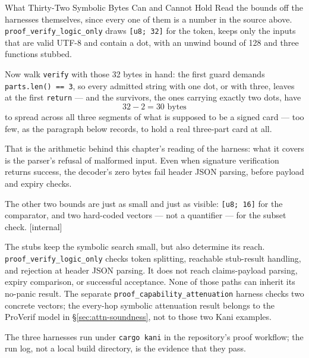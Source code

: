 \documentclass[11pt,a4paper]{article}
\theoremstyle{definition}
\begin{document}
\begin{pdexample}{What Thirty-Two Symbolic Bytes Can and Cannot Hold}
\setlength{\parskip}{4pt plus 1pt}
Read the bounds off the harnesses themselves, since every one of them is a
number in the source above. \texttt{proof\_verify\_logic\_only} draws
\texttt{[u8;\,32]} for the token, keeps only the inputs that are valid UTF-8
and contain a dot, with an unwind bound of 128 and three functions stubbed.

Now walk \texttt{verify} with those 32 bytes in hand: the first guard demands
\texttt{parts.len() == 3}, so every admitted string with one dot, or with
three, leaves at the first \texttt{return} --- and the survivors, the ones
carrying exactly two dots, have
\[
32 - 2 = 30 \text{ bytes}
\]
to spread across all three
segments of what is supposed to be a signed card --- too few, as the paragraph
below records, to hold a real three-part card at all.

That is the arithmetic
behind this chapter's reading of the harness: what it covers is the parser's
refusal of malformed input. Even when signature verification returns success,
the decoder's zero bytes fail header JSON parsing, before payload and expiry
checks.

The other two bounds are just as small and just
as visible: \texttt{[u8;\,16]} for the comparator, and two hard-coded vectors
--- not a quantifier --- for the subset check. [internal]
\end{pdexample}

The stubs keep the symbolic search small, but also determine its reach.
\texttt{proof\allowbreak\_verify\allowbreak\_logic\allowbreak\_only} checks
token splitting, reachable stub-result handling, and rejection at header JSON
parsing. It does not reach claims-payload parsing, expiry comparison, or successful
acceptance. None of those paths can inherit its no-panic result. The separate
\texttt{proof\_capability\_attenuation} harness checks two concrete vectors;
the every-hop symbolic attenuation result belongs to the ProVerif model in
\S\ref{sec:attn-soundness}, not to those two Kani examples.

The three harnesses run under \texttt{cargo kani} in the repository's proof workflow; the run log, not a local build directory, is the evidence that they pass.

\pdexercisepointer{\ref{ex:anchor-kani-scope}}{\ref{ex:anchor-model-vs-code}}{\pageref{ex:anchor-kani-scope}}

\end{document}
